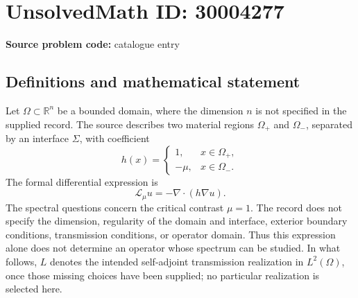 \documentclass[11pt]{article}
\newcommand{\R}{\mathbb{R}}
\begin{document}
\section*{UnsolvedMath ID: 30004277}
\textbf{Source problem code:} catalogue entry
\subsection{Definitions and mathematical statement}
Let \(\Omega\subset\R^n\) be a bounded domain, where the dimension \(n\) is not specified in the supplied record. The source describes two material regions \(\Omega_+\) and \(\Omega_-\), separated by an interface \(\Sigma\), with coefficient
\[
 h(x)=\begin{cases}
 1,&x\in\Omega_+,\\
 -\mu,&x\in\Omega_-.
 \end{cases}
\]
The formal differential expression is
\[
 \mathcal L_\mu u=-\nabla\cdot(h\nabla u).
\]
The spectral questions concern the critical contrast \(\mu=1\). The record does not specify the dimension, regularity of the domain and interface, exterior boundary conditions, transmission conditions, or operator domain. Thus this expression alone does not determine an operator whose spectrum can be studied. In what follows, \(L\) denotes the intended self-adjoint transmission realization in \(L^2(\Omega)\), once those missing choices have been supplied; no particular realization is selected here.
\end{document}
